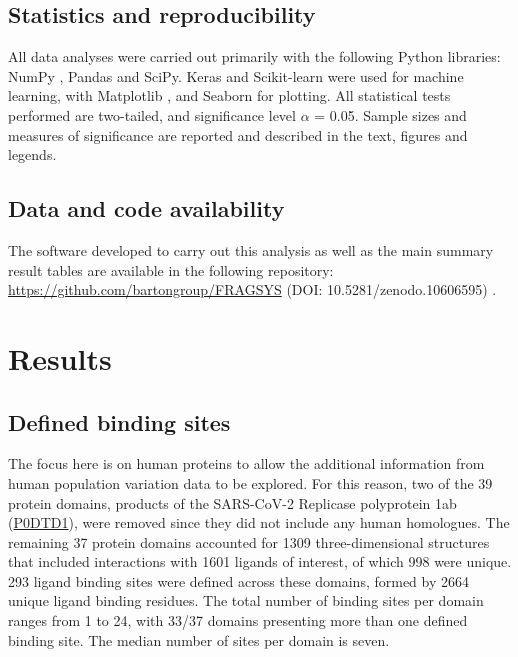 \subsection{Statistics and reproducibility}

All data analyses were carried out primarily with  the following Python libraries: NumPy \cite{HARRIS_2020_NUMPY}, Pandas \cite{MCKINNEY_2010_PANDAS,PANDAS_2022_PANDAS} and SciPy. Keras and Scikit-learn were used for machine learning, with Matplotlib \cite{HUNTER_2007_MATPLOTLIB}, and Seaborn \cite{WASKOM_2021_SEABORN} for plotting. All statistical tests performed are two-tailed, and significance level $\alpha$ = 0.05. Sample sizes and measures of significance are reported and described in the text, figures and legends.

\subsection{Data and code availability}

The software developed to carry out this analysis as well as the main summary result tables are available in the following repository: \url{https://github.com/bartongroup/FRAGSYS} (DOI: 10.5281/zenodo.10606595) \cite{UTGES_2024_FRAGSYS_ZENODO}.

\section{Results}

\subsection{Defined binding sites}

The focus here is on human proteins to allow the additional information from human population variation data to be explored. For this reason, two of the 39 protein domains, products of the SARS-CoV-2 Replicase polyprotein 1ab (\href{https://www.uniprot.org/uniprotkb/P0DTD1/entry}{P0DTD1}), were removed since they did not include any human homologues. The remaining 37 protein domains accounted for 1309 three-dimensional structures that included interactions with 1601 ligands of interest, of which 998 were unique. 293 ligand binding sites were defined across these domains, formed by 2664 unique ligand binding residues. The total number of binding sites per domain ranges from 1 to 24, with 33/37 domains presenting more than one defined binding site. The median number of sites per domain is seven.

